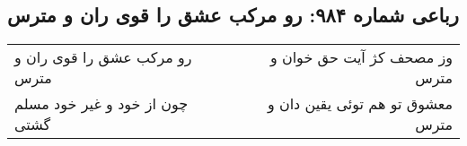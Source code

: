 \begin{center}
\section*{رباعی شماره ۹۸۴: رو مرکب عشق را قوی ران و مترس}
\label{sec:0984}
\begin{longtable}{l p{0.5cm} r}
رو مرکب عشق را قوی ران و مترس
&&
وز مصحف کژ آیت حق خوان و مترس
\\
چون از خود و غیر خود مسلم گشتی
&&
معشوق تو هم توئی یقین دان و مترس
\\
\end{longtable}
\end{center}
